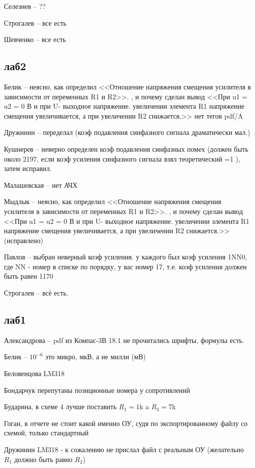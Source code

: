 \documentclass[a4paper,11pt]{article}
\begin{document}
Селезнев -- ?? %

Строгалев -- все есть 

Шевченко -- все есть

\newpage
\subsection*{лаб2}

Белик -- неясно, как определил <<Отношение напряжения смещения усилителя в зависимости от переменных R1 и R2>>.
, и почему сделан вывод 
<<При u1 = u2 = 0 В и при U- выходное напряжение. увеличении элемента R1 напряжение смещения увеличивается, а при увеличении R2 снижается.>>
нет тегов pdf/A


Дружинин -- переделал (коэф подавления синфазного сигнала драматически мал.)

Кушнерев -- неверно определен коэф подавления синфазных помех (должен быть около 2197, если коэф усиления синфазного сигнала взял теоретический =1 ), затем исправил.

Малашевская -- нет АЧХ

Мыдлык -- неясно, как определил <<Отношение напряжения смещения усилителя в зависимости от переменных R1 и R2>>.
, и почему сделан вывод 
<<При u1 = u2 = 0 В и при U- выходное напряжение. увеличении элемента R1 напряжение смещения увеличивается, а при увеличении R2 снижается.>>(исправлено)

Павлов -- выбран неверный коэф усиления. у каждого был коэф усиления 1NN0, где NN - номер в списке по порядку, у вас номер 17, т.е. коэф усиления должен быть равен 1170

Строгалев -- всё есть.
\newpage
\subsection*{лаб1}
Александрова -- pdf из Компас-3В 18.1 не прочитались шрифты, формулы есть.

Белик        -- $10^{-6}$ это микро, мкВ, а не милли (мВ)

Беловенцова     LM318

Бондарчук  перепутаны позиционные номера у сопротивлений

Бударина, в схеме 4 лучше поставить $R_1=1$k a $R_3=7$k

Гоган, в отчете не стоит какой именно ОУ, судя по экспортированному файлу со схемой, только стандартный

Дружинин  LM318 - к сожалению не прислал файл с реальным ОУ (желательно $R_1$ должно быть равно $R_2$)
\end{document}
